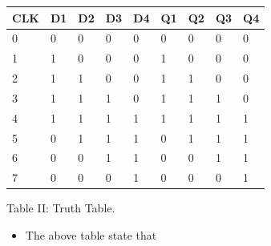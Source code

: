 \documentclass[journal,12pt,twocolumn]{IEEEtran}
\begin{document}
\begin{center}
\small   
\begin{tabular}{|l|l|l|l|l|l|l|l|l|}
\hline
\textbf{CLK} & \textbf{D1} & \textbf{D2} & \textbf{D3} & \textbf{D4} & \textbf{Q1} & \textbf{Q2} & \textbf{Q3} & \textbf{Q4} \\ \hline
0            & 0           & 0           & 0           & 0           & 0           & 0           & 0           & 0           \\ \hline
1            & 1           & 0           & 0           & 0           & 1           & 0           & 0           & 0           \\ \hline
2            & 1           & 1           & 0           & 0           & 1           & 1           & 0           & 0           \\ \hline
3            & 1           & 1           & 1           & 0           & 1           & 1           & 1           & 0           \\ \hline
4            & 1           & 1           & 1           & 1           & 1           & 1           & 1           & 1           \\ \hline
5            & 0           & 1           & 1           & 1           & 0           & 1           & 1           & 1           \\ \hline
6            & 0           & 0           & 1           & 1           & 0           & 0           & 1           & 1           \\ \hline
7            & 0           & 0           & 0           & 1           & 0           & 0           & 0           & 1           \\ \hline
\end{tabular}
   
   \vspace{0.5cm}
   \centering Table II: Truth Table.
\label{table:2}
 \end{center}
 \begin{itemize}
 \item The above table state that
 \end{itemize}
\end{document}
